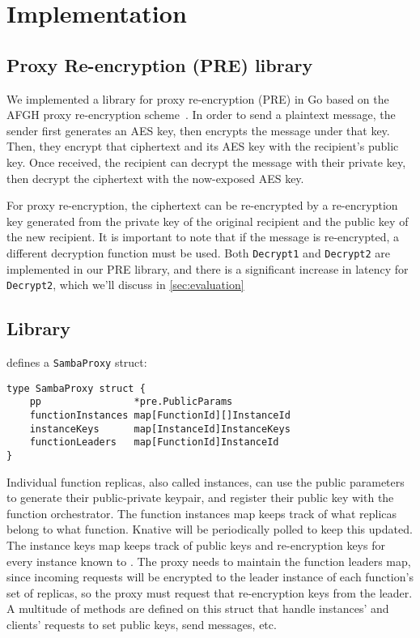 \section{Implementation}
\label{sec:implementation}

\subsection{Proxy Re-encryption (PRE) library}
%
We implemented a library for proxy re-encryption (PRE) in Go based on the AFGH proxy re-encryption scheme~\cite{05-ndss-improved_proxy_reencryption}.
In order to send a plaintext message, the sender first generates an AES key, then encrypts the message under that key.
Then, they encrypt that ciphertext and its AES key with the recipient's public key.
Once received, the recipient can decrypt the message with their private key, then decrypt the ciphertext with the now-exposed AES key.
%

%
For proxy re-encryption, the ciphertext can be re-encrypted by a re-encryption key generated from the private key of the original recipient and the public key of the new recipient.
%
It is important to note that if the message is re-encrypted, a different decryption function must be used.
%
Both \texttt{Decrypt1} and \texttt{Decrypt2} are implemented in our PRE library, and there is a significant increase in latency for \texttt{Decrypt2}, which we'll discuss in \ref{sec:evaluation}


\subsection{\SystemName Library}
%
\SystemName defines a \texttt{SambaProxy} struct:

\begin{verbatim}
type SambaProxy struct {
	pp                *pre.PublicParams
	functionInstances map[FunctionId][]InstanceId
	instanceKeys      map[InstanceId]InstanceKeys
	functionLeaders   map[FunctionId]InstanceId
}
\end{verbatim}

Individual function replicas, also called instances, can use the public parameters to generate their public-private keypair, and register their public key with the function orchestrator.
%
The function instances map keeps track of what replicas belong to what function. Knative will be periodically polled to keep this updated.
%
The instance keys map keeps track of public keys and re-encryption keys for every instance known to \SystemName.
%
The proxy needs to maintain the function leaders map, since incoming requests will be encrypted to the leader instance of each function's set of replicas, so the proxy must request that re-encryption keys from the leader.
%
A multitude of methods are defined on this struct that handle instances' and clients' requests to set public keys, send messages, etc.


